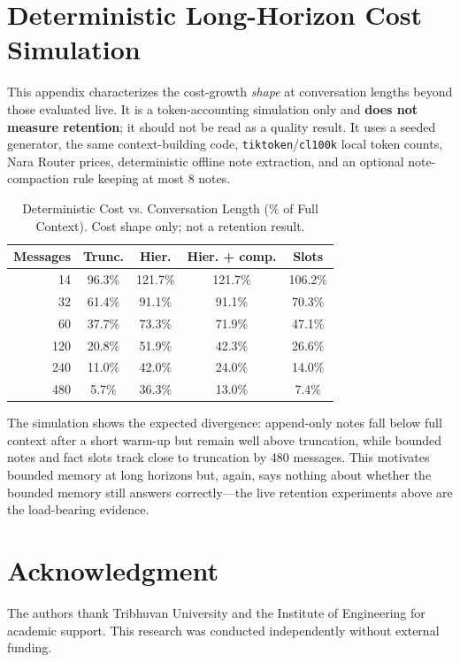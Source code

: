\documentclass[conference]{IEEEtran}
\begin{document}
\appendices
\section{Deterministic Long-Horizon Cost Simulation}
\label{app:sim}

This appendix characterizes the cost-growth \emph{shape} at conversation lengths
beyond those evaluated live. It is a token-accounting simulation only and
\textbf{does not measure retention}; it should not be read as a quality result.
It uses a seeded generator, the same context-building code,
\texttt{tiktoken}/\texttt{cl100k} local token counts, Nara Router prices, deterministic
offline note extraction, and an optional note-compaction rule keeping at most 8
notes.

\begin{table}[h]
\centering
\caption{Deterministic Cost vs. Conversation Length (\% of Full Context). Cost shape only; not a retention result.}
\label{tab:growth}
\begin{tabular}{rcccc}
\toprule
\textbf{Messages} & \textbf{Trunc.} & \textbf{Hier.} & \textbf{Hier. + comp.} & \textbf{Slots} \\
\midrule
14 & 96.3\% & 121.7\% & 121.7\% & 106.2\% \\
32 & 61.4\% & 91.1\% & 91.1\% & 70.3\% \\
60 & 37.7\% & 73.3\% & 71.9\% & 47.1\% \\
120 & 20.8\% & 51.9\% & 42.3\% & 26.6\% \\
240 & 11.0\% & 42.0\% & 24.0\% & 14.0\% \\
480 & 5.7\% & 36.3\% & 13.0\% & 7.4\% \\
\bottomrule
\end{tabular}
\end{table}

The simulation shows the expected divergence: append-only notes fall below full
context after a short warm-up but remain well above truncation, while bounded
notes and fact slots track close to truncation by 480 messages. This motivates
bounded memory at long horizons but, again, says nothing about whether the
bounded memory still answers correctly---the live retention experiments above are
the load-bearing evidence.

\section*{Acknowledgment}

The authors thank Tribhuvan University and the Institute of Engineering for academic support. This research was conducted independently without external funding.
\end{document}
